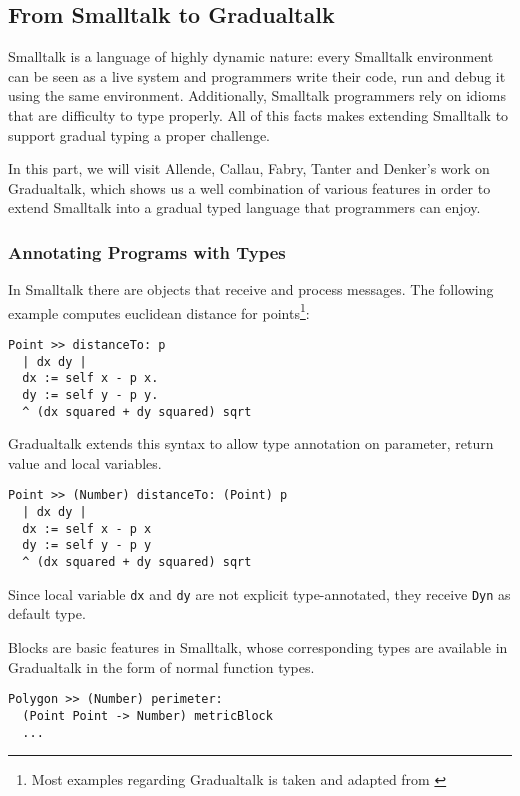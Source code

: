 \subsection{From Smalltalk to Gradualtalk}

Smalltalk is a language of highly dynamic nature:
every Smalltalk environment can be seen as a live system
and programmers write their code, run and debug it using
the same environment. Additionally, Smalltalk programmers 
rely on idioms that are difficulty to type properly.
All of this facts makes extending Smalltalk to support gradual
typing a proper challenge.

In this part, we will visit
Allende, Callau, Fabry, Tanter and Denker's work on Gradualtalk\cite{allende2014gradual}, which shows
us a well combination of various features in order to extend Smalltalk
into a gradual typed language that programmers can enjoy.

\subsubsection{Annotating Programs with Types}

In Smalltalk there are objects that receive and process messages.
The following example computes euclidean distance for points\footnote{
Most examples regarding Gradualtalk is taken and adapted from
\cite{allende2014gradual}}:

\begin{verbatim}
Point >> distanceTo: p
  | dx dy |
  dx := self x - p x.
  dy := self y - p y.
  ^ (dx squared + dy squared) sqrt
\end{verbatim}

Gradualtalk extends this syntax to allow
type annotation on parameter, return value and local variables.

\begin{verbatim}
Point >> (Number) distanceTo: (Point) p
  | dx dy |
  dx := self x - p x
  dy := self y - p y
  ^ (dx squared + dy squared) sqrt
\end{verbatim}

Since local variable \texttt{dx} and \texttt{dy} are not explicit type-annotated,
they receive \texttt{Dyn} as default type.

Blocks are basic features in Smalltalk,
whose corresponding types are available in Gradualtalk in the form of normal function types.

\begin{verbatim}
Polygon >> (Number) perimeter:
  (Point Point -> Number) metricBlock
  ...
\end{verbatim}

